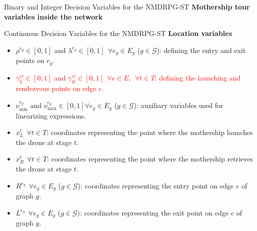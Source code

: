 \documentclass[slidestop,usepdftitle=false,10pt]{beamer}
\begin{document}
    \begin{frame}{Binary and Integer Decision Variables for the NMDRPG-ST}
    \textbf{Mothership tour variables inside the network}
    \begin{itemize}
    \end{itemize}
    \end{frame}
    
    \begin{frame}{Continuous Decision Variables for the NMDRPG-ST}
	\textbf{Location variables}
	\begin{itemize}
	    \item $\rho^{e_g} \in [0,1]$ and $\lambda^{e_g} \in [0,1] \:\: \forall e_g \in E_g$ ($g \in \mathcal{G}$): defining the entry and exit points on $e_g$.
	    \item \textcolor{red}{$\gamma_L^{et} \in [0,1]$ and $\gamma_{R}^{et} \in [0,1] \:\: \forall e \in E, \:\: \forall t \in T$: defining the launching and rendezvous points on edge $e$.}
        \item $\nu_\text{min}^{e_g}$ and $\nu_\text{max}^{e_g} \in [0,1] \forall e_g \in E_g$ ($g \in \mathcal{G}$): auxiliary variables used for linearizing expressions.
        \item $x_L^t \:\: \forall t \in T$: coordinates representing the point where the mothership launches the drone at stage $t$.
        \item $x_R^t \:\: \forall t \in T$: coordinates representing the point where the mothership retrieves the drone at stage $t$.
        \item $R^{e_g} \:\: \forall e_g \in E_g$ ($g \in \mathcal{G}$): coordinates representing the entry point on edge $e$ of graph $g$.
        \item $L^{e_g} \:\: \forall e_g \in E_g$ ($g \in \mathcal{G})$: coordinates representing the exit point on edge $e$ of graph $g$.
    \end{itemize}
    \end{frame}
    
\end{document}
